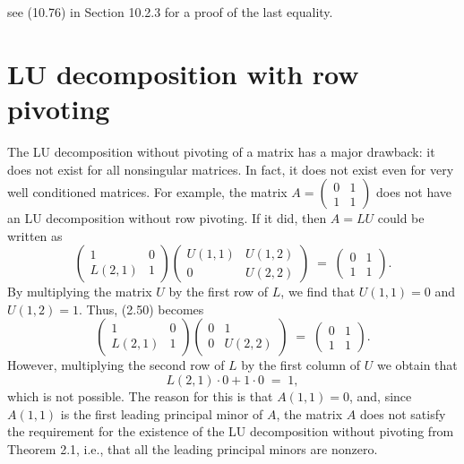
see (10.76) in Section 10.2.3 for a proof of the last equality.

\section{LU decomposition with row pivoting}

The LU decomposition without pivoting of a matrix has a major drawback: it does not
exist for all nonsingular matrices. In fact, it does not exist even for very well
conditioned matrices. For example, the matrix $A = \begin{pmatrix} 0 & 1\\ 1 & 1
\end{pmatrix}$ does not have an LU decomposition without row pivoting. If it did,
then $A=LU$ could be written as
\begin{equation}
\begin{pmatrix} 1 & 0\\ L(2,1) & 1\end{pmatrix}
\begin{pmatrix} U(1,1) & U(1,2)\\ 0 & U(2,2)\end{pmatrix}
\;=\;
\begin{pmatrix} 0 & 1\\ 1 & 1\end{pmatrix}.
\end{equation}
By multiplying the matrix $U$ by the first row of $L$, we find that $U(1,1)=0$ and
$U(1,2)=1$. Thus, (2.50) becomes
\[
\begin{pmatrix} 1 & 0\\ L(2,1) & 1\end{pmatrix}
\begin{pmatrix} 0 & 1\\ 0 & U(2,2)\end{pmatrix}
\;=\;
\begin{pmatrix} 0 & 1\\ 1 & 1\end{pmatrix}.
\]
However, multiplying the second row of $L$ by the first column of $U$ we obtain that
\[
L(2,1)\cdot 0 + 1\cdot 0 \;=\; 1,
\]
which is not possible. The reason for this is that $A(1,1)=0$, and, since $A(1,1)$
is the first leading principal minor of $A$, the matrix $A$ does not satisfy the
requirement for the existence of the LU decomposition without pivoting from
Theorem 2.1, i.e., that all the leading principal minors are nonzero.

